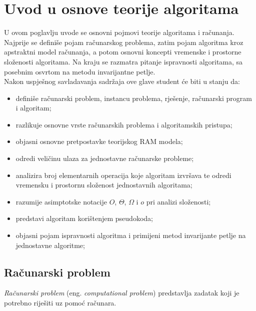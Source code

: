 \chapter{Uvod u osnove teorije algoritama}

U ovom poglavlju uvode se osnovni pojmovi teorije algoritama i računanja. Najprije se definiše pojam računarskog problema, zatim pojam algoritma kroz apstraktni model računanja, a potom osnovni koncepti vremenske i prostorne složenosti algoritama. Na kraju se razmatra pitanje ispravnosti algoritama, sa posebnim osvrtom na metodu invarijantne petlje.\\


Nakon uspješnog savladavanja sadržaja ove glave student će biti u stanju da:

\begin{itemize}
	\item definiše računarski problem, instancu problema, rješenje, računarski program i algoritam;
	
	\item razlikuje osnovne vrste računarskih problema i algoritamskih pristupa;
	
	\item objasni osnovne pretpostavke teorijskog RAM modela;
	
	\item odredi veličinu ulaza za jednostavne računarske probleme;
	
	\item analizira broj elementarnih operacija koje algoritam izvršava te odredi vremensku i prostornu složenost jednostavnih algoritama;
	
	\item razumije asimptotske notacije $O$, $\Theta$, $\Omega$ i $o$	pri analizi složenosti;
	
	\item predstavi algoritam korištenjem pseudokoda;
	
	\item objasni pojam ispravnosti algoritma i primijeni metod	invarijante petlje na jednostavne algoritme;
	
 
\end{itemize}

\section{Računarski problem}

\textit{Računarski problem} (eng. \textit{computational problem}) predstavlja zadatak koji je potrebno riješiti uz pomoć računara.

